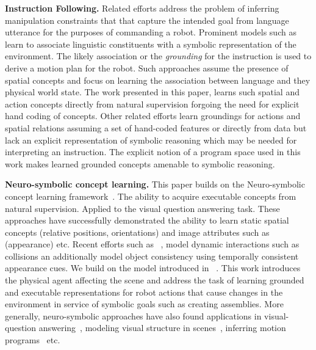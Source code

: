 \textbf{Instruction Following. }
Related efforts address the problem of inferring manipulation constraints \cite{howard2014natural, paul2016efficient} 
that that capture the intended goal from language utterance for the purposes of commanding a robot. 
%
Prominent models such as learn to associate linguistic constituents with a symbolic representation of the environment. 
%
The likely association or the \emph{grounding} for the instruction is used to derive a motion plan for the robot. 
%
Such approaches assume the presence of spatial concepts and focus on learning the association between language 
and they physical world state. 
%
The work presented in this paper, learns such spatial and action concepts directly from natural supervision forgoing the need 
for explicit hand coding of concepts. 
%
Other related efforts \cite{paul2018temporal, roy2019leveraging} 
learn groundings for actions and spatial relations assuming a set of hand-coded features 
or directly from data but lack an explicit representation of symbolic reasoning which may be needed for interpreting 
an instruction. 
%
The explicit notion of a program space used in this work makes learned grounded concepts amenable 
to symbolic reasoning.  
%

 
\textbf{Neuro-symbolic concept learning. } 
%
This paper builds on the Neuro-symbolic concept learning framework~\cite{Mao2019NeuroSymbolic}. 
The ability to acquire executable concepts from natural supervision. Applied to the visual question answering task. 
%
These approaches have successfully demonstrated the ability to learn static spatial concepts (relative positions, orientations)
and image attributes such as (appearance) etc. 
%
Recent efforts such as ~\cite{yi2019clevrer}, model dynamic interactions such as collisions an additionally model object consistency 
using temporally consistent appearance cues. 
%
We build on the model introduced in ~\cite{Mao2019NeuroSymbolic}. 
%
This work introduces the physical agent affecting the scene and 
address the task of learning grounded and executable representations for robot actions that cause changes in the 
environment in service of symbolic goals such as creating assemblies. 
%
More generally, neuro-symbolic approaches have also found applications in visual-question answering~\cite{yi2018neural}, 
modeling visual structure in scenes~\cite{li2020multi}, inferring motion programs~\cite{kulal2021hierarchical} etc.  
%
% 

\fi

